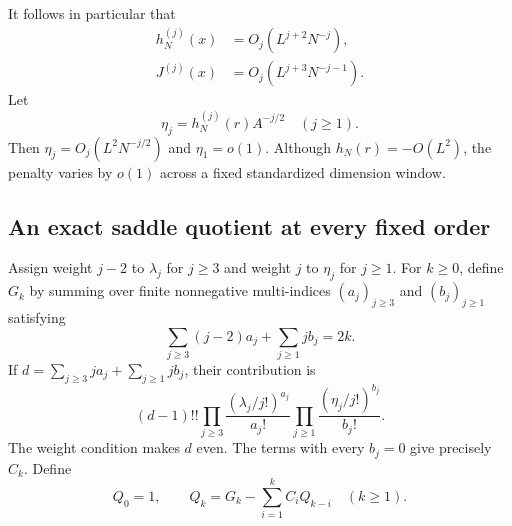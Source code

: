 It follows in particular that
\begin{align}
 h_N^{(j)}(x)&=O_j(L^{j+2}N^{-j}),\label{pdt:eq:hderivatives}\\
 J^{(j)}(x)&=O_j(L^{j+3}N^{-j-1}).\label{pdt:eq:Jderivatives}
\end{align}
Let
\begin{equation}\label{pdt:eq:etas}
 \eta_j=h_N^{(j)}(r)A^{-j/2}\quad(j\ge1).
\end{equation}
Then $\eta_j=O_j(L^2N^{-j/2})$ and $\eta_1=o(1)$. Although $h_N(r)=-O(L^2)$, the penalty varies by $o(1)$ across a fixed standardized dimension window.

\subsection{An exact saddle quotient at every fixed order}
Assign weight $j-2$ to $\lambda_j$ for $j\ge3$ and weight $j$ to $\eta_j$ for $j\ge1$. For $k\ge0$, define $G_k$ by summing over finite nonnegative multi-indices $(a_j)_{j\ge3}$ and $(b_j)_{j\ge1}$ satisfying
\[
 \sum_{j\ge3}(j-2)a_j+\sum_{j\ge1}jb_j=2k.
\]
If $d=\sum_{j\ge3}ja_j+\sum_{j\ge1}jb_j$, their contribution is
\begin{equation}\label{pdt:eq:Gk}
 (d-1)!!\prod_{j\ge3}\frac{(\lambda_j/j!)^{a_j}}{a_j!}
          \prod_{j\ge1}\frac{(\eta_j/j!)^{b_j}}{b_j!}.
\end{equation}
The weight condition makes $d$ even. The terms with every $b_j=0$ give precisely $C_k$. Define
\begin{equation}\label{pdt:eq:Qrec}
 Q_0=1,\qquad Q_k=G_k-\sum_{i=1}^k C_iQ_{k-i}\quad(k\ge1).
\end{equation}

